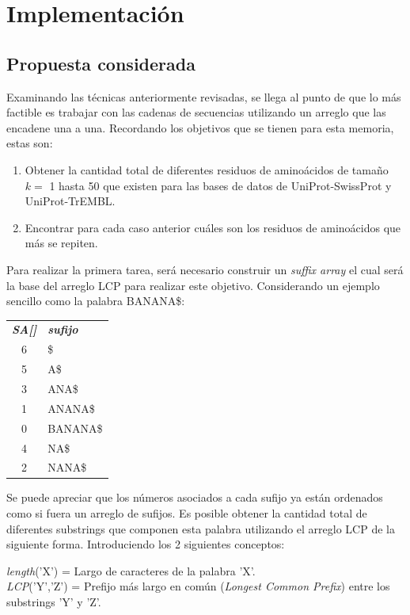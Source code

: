 \chapter{Implementación}

\section{Propuesta considerada}

Examinando las técnicas anteriormente revisadas, se llega al punto de que lo más factible es trabajar con las cadenas de secuencias utilizando un arreglo que las encadene una a una. Recordando los objetivos que se tienen para esta memoria, estas son:

\begin{enumerate}
\item Obtener la cantidad total de diferentes residuos de aminoácidos de tamaño $k =$ 1 hasta 50 que existen para las bases de datos de UniProt-SwissProt y UniProt-TrEMBL.
\item Encontrar para cada caso anterior cuáles son los residuos de aminoácidos que más se repiten.
\end{enumerate}

Para realizar la primera tarea, será necesario construir un \textit{suffix array} el cual será la base del arreglo LCP para realizar este objetivo. Considerando un ejemplo sencillo como la palabra BANANA\$:

\begin{table}[H]
	\centering
	\begin{tabular}{c l}
		\textit{\textbf{SA[]}} & \textit{\textbf{sufijo}}\\
		6 & \$\\
		5 & A\$\\
		3 & ANA\$\\
		1 & ANANA\$\\
		0 & BANANA\$\\
		4 & NA\$\\
		2 & NANA\$\\
	\end{tabular}
\end{table}

Se puede apreciar que los números asociados a cada sufijo ya están ordenados como si fuera un arreglo de sufijos. Es posible obtener la cantidad total de diferentes substrings que componen esta palabra utilizando el arreglo LCP de la siguiente forma. Introduciendo los 2 siguientes conceptos:

{\it{length}}('X') = Largo de caracteres de la palabra 'X'.\\
{\it{LCP}}('Y','Z') = Prefijo más largo en común ({\it{Longest Common Prefix}}) entre los substrings 'Y' y 'Z'.

